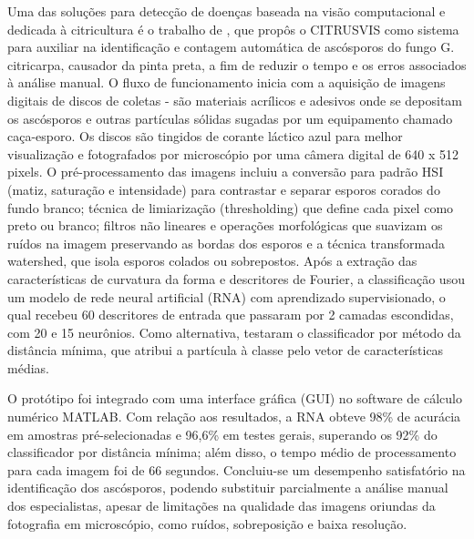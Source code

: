 Uma das soluções para detecção de doenças baseada na visão computacional e dedicada à citricultura é o trabalho de \cite{Pazoti2005}, que propôs o CITRUSVIS como sistema para auxiliar na identificação e contagem automática de ascósporos do fungo G. citricarpa, causador da pinta preta, a fim de reduzir o tempo e os erros associados à análise manual. O fluxo de funcionamento inicia com a aquisição de imagens digitais de discos de coletas - são materiais acrílicos e adesivos onde se depositam os ascósporos e outras partículas sólidas sugadas por um equipamento chamado caça-esporo. Os discos são tingidos de corante láctico azul para melhor visualização e fotografados por microscópio por uma câmera digital de 640 x 512 pixels. O pré-processamento das imagens incluiu a conversão para padrão HSI (matiz, saturação e intensidade) para contrastar e separar esporos corados do fundo branco; técnica de limiarização (thresholding) que define cada pixel como preto ou branco; filtros não lineares e operações morfológicas que suavizam os ruídos na imagem preservando as bordas dos esporos e a técnica transformada watershed, que isola esporos colados ou sobrepostos. Após a extração das características de curvatura da forma e descritores de Fourier, a classificação usou um modelo de rede neural artificial (RNA) com aprendizado supervisionado, o qual recebeu 60 descritores de entrada que passaram por 2 camadas escondidas, com 20 e 15 neurônios. Como alternativa, testaram o classificador por método da distância mínima, que atribui a partícula à classe pelo vetor de características médias.

O protótipo foi integrado com uma interface gráfica (GUI) no software de cálculo numérico MATLAB. Com relação aos resultados, a RNA obteve 98\% de acurácia em amostras pré-selecionadas e 96,6\% em testes gerais, superando os 92\% do classificador por distância mínima; além disso, o tempo médio de processamento para cada imagem foi de 66 segundos. Concluiu-se um desempenho satisfatório na identificação dos ascósporos, podendo substituir parcialmente a análise manual dos especialistas, apesar de limitações na qualidade das imagens oriundas da fotografia em microscópio, como ruídos, sobreposição e baixa resolução.


